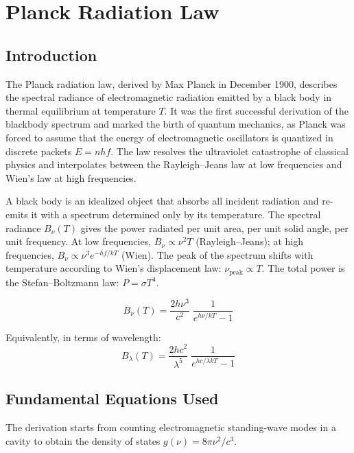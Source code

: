 \chapter{Planck Radiation Law}

\section*{Introduction}

The Planck radiation law, derived by Max Planck in December 1900, describes the spectral radiance of electromagnetic radiation emitted by a black body in thermal equilibrium at temperature $T$. It was the first successful derivation of the blackbody spectrum and marked the birth of quantum mechanics, as Planck was forced to assume that the energy of electromagnetic oscillators is quantized in discrete packets $E = nhf$. The law resolves the ultraviolet catastrophe of classical physics and interpolates between the Rayleigh--Jeans law at low frequencies and Wien's law at high frequencies.

A black body is an idealized object that absorbs all incident radiation and re-emits it with a spectrum determined only by its temperature. The spectral radiance $B_{\nu}(T)$ gives the power radiated per unit area, per unit solid angle, per unit frequency. At low frequencies, $B_{\nu} \propto \nu^{2}T$ (Rayleigh--Jeans); at high frequencies, $B_{\nu} \propto \nu^{3}e^{-hf/kT}$ (Wien). The peak of the spectrum shifts with temperature according to Wien's displacement law: $\nu_{\text{peak}} \propto T$. The total power is the Stefan--Boltzmann law: $P = \sigma T^{4}$.


\begin{equation}
\boxed{\; B_{\nu}(T) = \frac{2h\nu^{3}}{c^{2}}\;\frac{1}{e^{h\nu/kT} - 1}\;}
\label{eq:planck-radiation}
\end{equation}

Equivalently, in terms of wavelength:
\begin{equation}
B_{\lambda}(T) = \frac{2hc^{2}}{\lambda^{5}}\;\frac{1}{e^{hc/\lambda kT} - 1}
\label{eq:planck-wavelength}
\end{equation}

\section*{Fundamental Equations Used}

The derivation starts from counting electromagnetic standing-wave modes in a cavity to obtain the density of states $g(\nu) = 8\pi\nu^2/c^3$.

